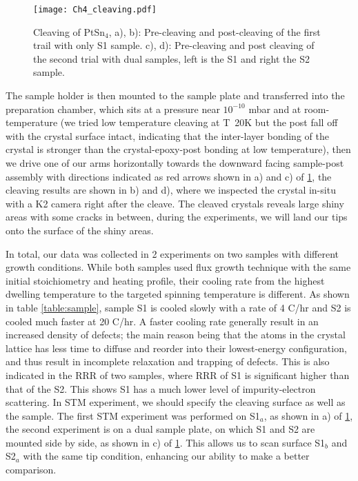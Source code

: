 \begin{figure}
	\centering
	\texttt{[image: Ch4\_cleaving.pdf]}
	\caption{Cleaving of PtSn$_4$, a), b): Pre-cleaving and post-cleaving of the first trail with only S1 sample. c), d): Pre-cleaving and post cleaving of the second trial with dual samples, left is the S1 and right the S2 sample. }
	\label{fig:ch4_cleaves}
\end{figure}

\par The sample holder is then mounted to the sample plate and transferred into the preparation chamber, which sits at a pressure near $10^{-10}$ mbar and at room-temperature (we tried low temperature cleaving at T~20K but the post fall off with the crystal surface intact, indicating that the inter-layer bonding of the crystal is stronger than the crystal-epoxy-post bonding at low temperature), then we drive one of our arms horizontally towards the downward facing sample-post assembly with directions indicated as red arrows shown in a) and c) of \ref{fig:ch4_cleaves}, the cleaving results are shown in b) and d), where we inspected the crystal in-situ with a K2 camera right after the cleave. The cleaved crystals reveals large shiny areas with some cracks in between, during the experiments, we will land our tips onto the surface of the shiny areas. 

\par In total, our data was collected in 2 experiments on two samples with different growth conditions. While both samples used flux growth technique with the same initial stoichiometry and heating profile, their cooling rate from the highest dwelling temperature to the targeted spinning temperature is different. As shown in table \ref{table:sample}, sample S1 is cooled slowly with a rate of 4 \degree C/hr and S2 is cooled much faster at 20 \degree C/hr. A faster cooling rate generally result in an increased density of defects; the main reason being that the atoms in the crystal lattice has less time to diffuse and reorder into their lowest-energy configuration, and thus result in incomplete relaxation and trapping of defects. This is also indicated in the \ac{RRR} of two samples, where \ac{RRR} of S1 is significant higher than that of the S2. This shows S1 has a much lower level of impurity-electron scattering.
In \ac{STM} experiment, we should specify the cleaving surface as well as the sample. The first \ac{STM} experiment was performed on S1$_a$, as shown in a) of \ref{fig:ch4_cleaves}, the second experiment is on a dual sample plate, on which S1 and S2 are mounted side by side, as shown in c) of \ref{fig:ch4_cleaves}. This allows us to scan surface S1$_b$ and S2$_a$ with the same tip condition, enhancing our ability to make a better comparison.

